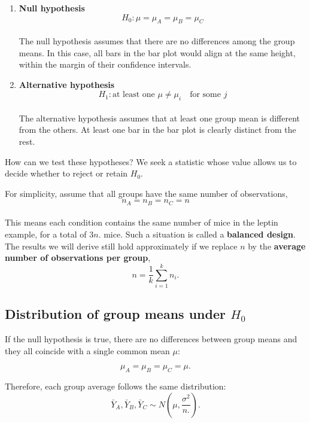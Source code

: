 \documentclass[
]{book}
\begin{document}
\begin{enumerate}
\def\labelenumi{\alph{enumi}.}
\item
  \textbf{Null hypothesis}\\
  \[
  H_0: \mu=\mu_A = \mu_B = \mu_C
  \]\\
  The null hypothesis assumes that there are no differences among the group means. In this case, all bars in the bar plot would align at the same height, within the margin of their confidence intervals.
\item
  \textbf{Alternative hypothesis}\\
  \[
  H_1: \text{at least one } \mu \neq \mu_i \quad \text{for some $j$} 
  \]\\
  The alternative hypothesis assumes that at least one group mean is different from the others. At least one bar in the bar plot is clearly distinct from the rest.
\end{enumerate}

How can we test these hypotheses? We seek a statistic whose value allows us to decide whether to reject or retain \(H_0\).

For simplicity, assume that all groups have the same number of observations,\\
\[
n_A = n_B = n_C = n
\]\\
This means each condition contains the same number of mice in the leptin example, for a total of \(3n.\) mice. Such a situation is called a \textbf{balanced design}. The results we will derive still hold approximately if we replace \(n\) by the \textbf{average number of observations per group},\\
\[
n = \frac{1}{k} \sum_{i=1}^k n_i.
\]

\hypertarget{distribution-of-group-means-under-h_0}{%
\subsection{\texorpdfstring{Distribution of group means under \(H_0\)}{Distribution of group means under H\_0}}\label{distribution-of-group-means-under-h_0}}

If the null hypothesis is true, there are no differences between group means and they all coincide with a single common mean \(\mu\):

\[
\mu_A = \mu_B = \mu_C = \mu.
\]

Therefore, each group average follows the same distribution:\\
\[
\bar{Y}_A, \bar{Y}_B, \bar{Y}_C \sim N\!\left(\mu, \frac{\sigma^2}{n.}\right).
\]
\end{document}
